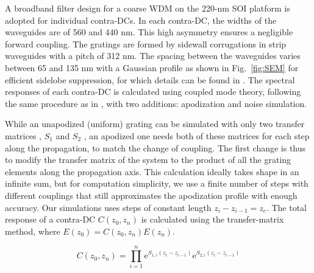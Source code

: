 \documentclass[osajnl,twocolumn,showpacs,superscriptaddress,10pt]{revtex4-1}
\newcommand{\me}{\mathrm{e}}
\newcommand*\diff{\mathop{}\!\mathrm{d}}
\begin{document}
A broadband filter design for a coarse WDM on the 220-nm SOI platform \cite{shi2013siliconCWDM} is adopted for individual contra-DCs.  
In each contra-DC, the widths of the waveguides are of 560 and 440 nm.
This high asymmetry ensures a negligible forward coupling. 
The gratings are formed by sidewall corrugations in strip waveguides with a pitch of 312 nm. 
The spacing between the waveguides varies between 65 and 135 nm with a Gaussian profile as shown in Fig.~\ref{fig:SEM} for efficient sidelobe suppression, for which details can be found in \cite{shi2013siliconCWDM}.
The spectral responses of each contra-DC is calculated using coupled mode theory, following the same procedure as in  \cite{shi2013siliconContraDC}, with two additions: apodization and noise simulation.

While an unapodized (uniform) grating can be simulated with only two transfer matrices , $S_1$ and $S_2$ \cite{shi2013siliconContraDC}, an apodized one needs both of these matrices for each step along the propagation, to match the change of coupling. 
The first change is thus to modify the transfer matrix of the system to the product of all the grating elements along the propagation axis.
This calculation ideally takes shape in an infinite sum, but for computation simplicity, we use a finite number of steps with different couplings that still approximates the apodization profile with enough accuracy. 
Our simulations uses  steps of constant length $z_i-z_{i-1}=z_c$. 
The total response of a contra-DC $C(z_0,z_n)$ is calculated using the transfer-matrix method, where $E(z_0)=C(z_0,z_n) E(z_n)$.

\begin{equation}[!h]
\label{eq:CMatrix}
 C(z_0,z_n) =  \prod_{i=1}^{n}\me^{S_{1,i}(z_i-z_{i-1})}\me^{S_{2,i}(z_i-z_{i-1})}
\end{equation}
\end{document}

